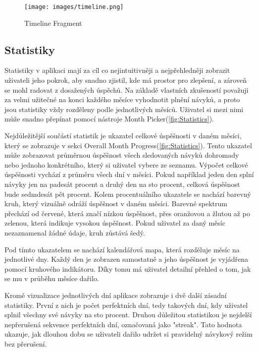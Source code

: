 \begin{figure}[H]
    \centering
    \texttt{[image: images/timeline.png]}
    \caption{Timeline Fragment}
    \label{fig:enter-label}
\end{figure}


\newpage

\subsection{Statistiky}
\hspace{14pt} Statistiky v aplikaci mají za cíl co nejintuitivněji a nejpřehledněji zobrazit uživateli jeho pokrok, aby snadno zjistil, kde má prostor pro zlepšení, a zároveň se mohl radovat z dosažených úspěchů. Na základě vlastních zkušeností považuji za velmi užitečné na konci každého měsíce vyhodnotit plnění návyků, a proto jsou statistiky vždy rozděleny podle jednotlivých měsíců. Uživatel si mezi nimi může snadno přepínat pomocí nástroje Month Picker(\autoref{fig:Statistics}).  

Nejdůležitější součástí statistik je ukazatel celkové úspěšnosti v daném měsíci, který se zobrazuje v sekci Overall Month Progress(\autoref{fig:Statistics}). Tento ukazatel může zobrazovat průměrnou úspěšnost všech sledovaných návyků dohromady nebo jednoho konkrétního, který si uživatel vybere ze seznamu. Výpočet celkové úspěšnosti vychází z průměru všech dní v měsíci. Pokud například jeden den splní návyky jen na padesát procent a druhý den na sto procent, celková úspěšnost bude sedmdesát pět procent. Kolem procentuálního ukazatele se nachází barevný kruh, který vizuálně odráží úspěšnost v daném měsíci. Barevné spektrum přechází od červené, která značí nízkou úspěšnost, přes oranžovou a žlutou až po zelenou, která indikuje vysokou úspěšnost. Pokud uživatel za daný měsíc nezaznamenal žádné údaje, kruh zůstává šedý.  

Pod tímto ukazatelem se nachází kalendářová mapa, která rozděluje měsíc na jednotlivé dny. Každý den je zobrazen samostatně a jeho úspěšnost je vyjádřena pomocí kruhového indikátoru. Díky tomu má uživatel detailní přehled o tom, jak se mu v průběhu měsíce dařilo.  

Kromě vizualizace jednotlivých dní aplikace zobrazuje i dvě další zásadní statistiky. První z nich je počet perfektních dní, tedy takových dní, kdy uživatel splnil všechny své návyky na sto procent. Druhou důležitou statistikou je nejdelší nepřerušená sekvence perfektních dní, označovaná jako "streak". Tato hodnota ukazuje, jak dlouhou dobu se uživateli dařilo udržet si pravidelný návykový režim bez přerušení.  

